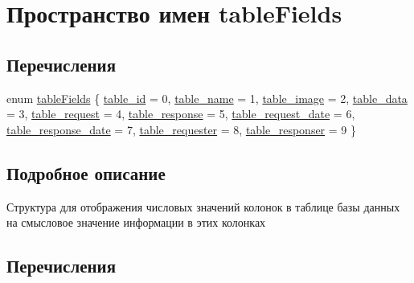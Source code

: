 \hypertarget{namespacetableFields}{}\section{Пространство имен table\+Fields}
\label{namespacetableFields}
\subsection*{Перечисления}
\begin{DoxyCompactItemize}
\item 
enum \hyperlink{namespacetableFields_af3f3b90a55c2fc0e89652786698aff33}{table\+Fields} \{ \newline
\hyperlink{namespacetableFields_af3f3b90a55c2fc0e89652786698aff33a3688697bcb72b96772a0b8bba66cf1f7}{table\+\_\+id} = 0, 
\hyperlink{namespacetableFields_af3f3b90a55c2fc0e89652786698aff33aac6d4c2d5e73ed2e112948441fa690f2}{table\+\_\+name} = 1, 
\hyperlink{namespacetableFields_af3f3b90a55c2fc0e89652786698aff33a0fbe15558786dbadd11790fa61e16cda}{table\+\_\+image} = 2, 
\hyperlink{namespacetableFields_af3f3b90a55c2fc0e89652786698aff33a4699aeeba4e2c1b5addebc6fde4e004e}{table\+\_\+data} = 3, 
\newline
\hyperlink{namespacetableFields_af3f3b90a55c2fc0e89652786698aff33a69b6cda96cbc1bd9d9fed0c8a0446d14}{table\+\_\+request} = 4, 
\hyperlink{namespacetableFields_af3f3b90a55c2fc0e89652786698aff33a7d5985177bdc214aa76c2956da19b292}{table\+\_\+response} = 5, 
\hyperlink{namespacetableFields_af3f3b90a55c2fc0e89652786698aff33a2488fe0a3fd10b94548a37839474f12a}{table\+\_\+request\+\_\+date} = 6, 
\hyperlink{namespacetableFields_af3f3b90a55c2fc0e89652786698aff33a08521c2e57d6cd782177ff9410c234a7}{table\+\_\+response\+\_\+date} = 7, 
\newline
\hyperlink{namespacetableFields_af3f3b90a55c2fc0e89652786698aff33af6c67a88169df220165a3f4b3edc5ca7}{table\+\_\+requester} = 8, 
\hyperlink{namespacetableFields_af3f3b90a55c2fc0e89652786698aff33abd83777ee433cf1acf2c16b45f03e677}{table\+\_\+responser} = 9
 \}
\end{DoxyCompactItemize}


\subsection{Подробное описание}
Структура для отображения числовых значений колонок в таблице базы данных на смысловое значение информации в этих колонках 

\subsection{Перечисления}
\mbox{\label{namespacetableFields_af3f3b90a55c2fc0e89652786698aff33}} 
